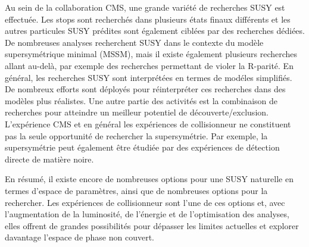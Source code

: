 Au sein de la collaboration CMS, une grande variété de recherches SUSY est effectuée. Les stops sont recherchés dans plusieurs états finaux différents et les autres particules SUSY prédites sont également ciblées par des recherches dédiées. De nombreuses analyses recherchent SUSY dans le contexte du modèle supersymétrique minimal (MSSM), mais il existe également plusieurs recherches allant au-delà, par exemple des recherches permettant de violer la R-parité. En général, les recherches SUSY sont interprétées en termes de modéles simplifiés. De nombreux efforts sont déployés pour réinterpréter ces recherches dans des modèles plus réalistes. Une autre partie des activités est la combinaison de recherches pour atteindre un meilleur potentiel de découverte/exclusion. L'expérience CMS et en général les expériences de collisionneur ne constituent pas la seule opportunité de rechercher la supersymétrie. Par exemple, la supersymétrie peut également être étudiée par des expériences de détection directe de matière noire.


En résumé, il existe encore de nombreuses options pour une SUSY naturelle en termes d'espace de paramètres, ainsi que de nombreuses options pour la rechercher. Les expériences de collisionneur sont l'une de ces options et, avec l'augmentation de la luminosité, de l'énergie et de l'optimisation des analyses, elles offrent de grandes possibilités pour dépasser les limites actuelles et explorer davantage l'espace de phase non couvert.

